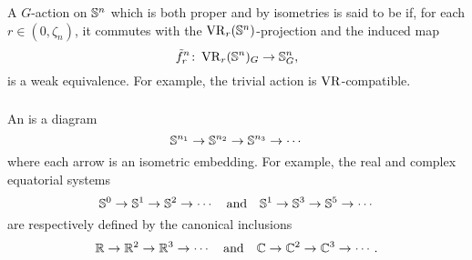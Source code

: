 \subsubsection{}

A \(G\)-action on \(\mathbb{S}^n\) which is both proper and by isometries is said to be  if, for each $r \in (0, \zeta_n)$, it commutes with the \(\operatorname{VR}_r(\mathbb{S}^n)\)-projection and the induced map
\[
\tilde f_r^n \colon \operatorname{VR}_r(\mathbb{S}^n)_G \to \mathbb{S}^n_G,
\]
is a weak equivalence.
For example, the trivial action is \(\operatorname{VR}\)-compatible.



\subsubsection{}

An  is a diagram
\[
\mathbb{S}^{n_1} \to \mathbb{S}^{n_2} \to \mathbb{S}^{n_3} \to \dotsb
\]
where each arrow is an isometric embedding.
For example, the real and complex equatorial systems
\[
\mathbb{S}^0 \to \mathbb{S}^1 \to \mathbb{S}^2 \to \dotsb
\quad\text{and}\quad
\mathbb{S}^1 \to \mathbb{S}^3 \to \mathbb{S}^5 \to \dotsb
\]
are respectively defined by the canonical inclusions
\[
\mathbb{R} \to \mathbb{R}^2 \to \mathbb{R}^3 \to \dotsb
\quad\text{and}\quad
\mathbb{C} \to \mathbb{C}^2 \to \mathbb{C}^3 \to \dotsb.
\]

\subsubsection{}

